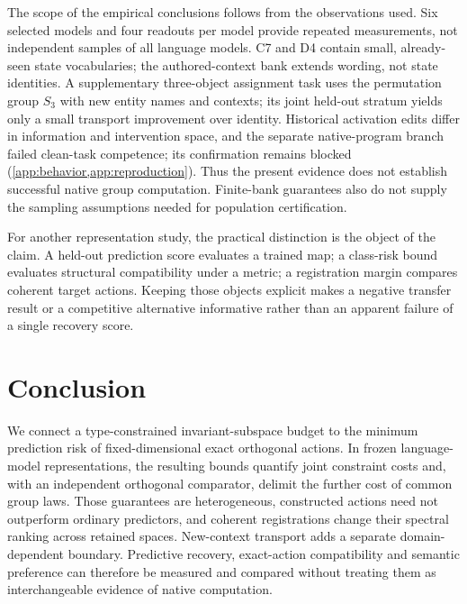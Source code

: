 The scope of the empirical conclusions follows from the observations used. Six selected models and four readouts per model provide repeated measurements, not independent samples of all language models. C7 and D4 contain small, already-seen state vocabularies; the authored-context bank extends wording, not state identities. A supplementary three-object assignment task uses the permutation group $S_3$ with new entity names and contexts; its joint held-out stratum yields only a small transport improvement over identity. Historical activation edits differ in information and intervention space, and the separate native-program branch failed clean-task competence; its confirmation remains blocked (\cref{app:behavior,app:reproduction}). Thus the present evidence does not establish successful native group computation. Finite-bank guarantees also do not supply the sampling assumptions needed for population certification.

For another representation study, the practical distinction is the object of the claim. A held-out prediction score evaluates a trained map; a class-risk bound evaluates structural compatibility under a metric; a registration margin compares coherent target actions. Keeping those objects explicit makes a negative transfer result or a competitive alternative informative rather than an apparent failure of a single recovery score.

\section{Conclusion}
We connect a type-constrained invariant-subspace budget to the minimum prediction risk of fixed-dimensional exact orthogonal actions. In frozen language-model representations, the resulting bounds quantify joint constraint costs and, with an independent orthogonal comparator, delimit the further cost of common group laws. Those guarantees are heterogeneous, constructed actions need not outperform ordinary predictors, and coherent registrations change their spectral ranking across retained spaces. New-context transport adds a separate domain-dependent boundary. Predictive recovery, exact-action compatibility and semantic preference can therefore be measured and compared without treating them as interchangeable evidence of native computation.

